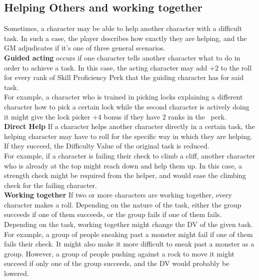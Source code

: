 \subsection{Helping Others and working together}\label{subsec:helping}
Sometimes, a character may be able to help another character with a difficult task.
In such a case, the player describes how exactly they are helping, and the GM adjudicates if it's one of three general scenarios.\\
\textbf{Guided acting} occurs if one character tells another character what to do in order to achieve a task.
In this case, the acting character may add +2 to the roll for every rank of Skill Proficiency Perk that the guiding character has for said task.\\
For example, a character who is trained in picking locks explaining a different character how to pick a certain lock while the second character is actively doing it might give the lock picker +4 bonus if they have 2 ranks in the~ perk.\\
\textbf{Direct Help} If a character helps another character directly in a certain task, the helping character may have to roll for the specific way in which they are helping.
If they succeed, the Difficulty Value of the original task is reduced.\\
For example, if a character is failing their check to climb a cliff, another character who is already at the top might reach down and help them up.
In this case, a strength check might be required from the helper, and would ease the climbing check for the failing character.\\
\textbf{Working together} If two or more characters are working together, every character makes a roll.
Depending on the nature of the task, either the group succeeds if one of them succeeds, or the group fails if one of them fails.\\
Depending on the task, working together might change the DV of the given task.\\
For example, a group of people sneaking past a monster might fail if one of them fails their check.
It might also make it more difficult to sneak past a monster as a group.
However, a group of people pushing against a rock to move it might succeed if only one of the group succeeds, and the DV would probably be lowered.

